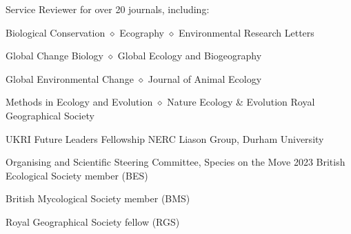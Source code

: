 
\begin{rubric}{Service}
	Reviewer for over 20 journals, including:
	\par Biological Conservation $\diamond$ Ecography $\diamond$ Environmental Research Letters
	\par Global Change Biology $\diamond$ Global Ecology and Biogeography
	\par Global Environmental Change $\diamond$ Journal of Animal Ecology
	\par Methods in Ecology and Evolution $\diamond$ Nature Ecology \& Evolution
	Royal Geographical Society
	\par UKRI Future Leaders Fellowship 
	NERC Liason Group, Durham University
	\par Organising and Scientific Steering Committee, Species on the Move 2023
	British Ecological Society member (BES)
	\par British Mycological Society member (BMS)
	\par Royal Geographical Society fellow (RGS)
\end{rubric}

